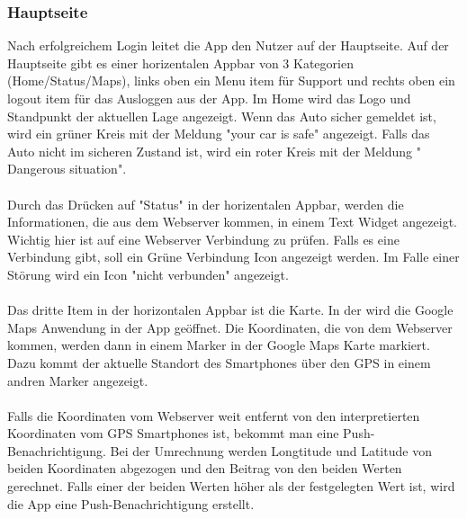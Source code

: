 \subsubsection{Hauptseite}
Nach erfolgreichem Login leitet die App den Nutzer auf der Hauptseite.
Auf der Hauptseite gibt es einer horizentalen Appbar von 3 Kategorien (Home/Status/Maps), links oben ein Menu item für Support und rechts oben ein logout item für das Ausloggen aus der App. 
Im Home wird das Logo und Standpunkt der aktuellen Lage angezeigt.
Wenn das Auto sicher gemeldet ist, wird ein grüner Kreis mit der Meldung "your car is safe" angezeigt. 
Falls das Auto nicht im sicheren Zustand ist, wird ein roter Kreis mit der Meldung " Dangerous situation".\\\\
Durch das Drücken auf "Status" in der horizentalen Appbar, werden die Informationen, die aus dem Webserver kommen, in einem Text Widget angezeigt.
Wichtig hier ist auf eine Webserver Verbindung zu prüfen. Falls es eine Verbindung gibt, soll ein Grüne Verbindung Icon angezeigt werden.
Im Falle einer Störung wird ein Icon "nicht verbunden" angezeigt.\\\\
Das dritte Item in der horizontalen Appbar ist die Karte. In der wird die Google Maps Anwendung in der App geöffnet.
Die Koordinaten, die von dem Webserver kommen, werden dann in einem Marker in der Google Maps Karte markiert. 
Dazu kommt der aktuelle Standort des Smartphones über den GPS in einem andren Marker angezeigt.\\\\
Falls die Koordinaten vom Webserver weit entfernt von den interpretierten Koordinaten vom GPS Smartphones ist, bekommt man eine Push-Benachrichtigung. Bei der Umrechnung werden Longtitude und Latitude von beiden Koordinaten abgezogen und den Beitrag von den beiden Werten gerechnet. 
Falls einer der beiden Werten höher als der festgelegten Wert ist, wird die App eine Push-Benachrichtigung erstellt.
